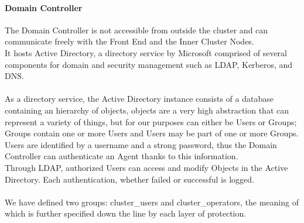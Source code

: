 \paragraph{Domain Controller}
The Domain Controller is not accessible from outside the cluster and can communicate freely with the Front End and the Inner Cluster Nodes.\\
It hosts Active Directory, a directory service by Microsoft comprised of several components for domain and security management such as LDAP, Kerberos, and DNS.\\ \\
As a directory service, the Active Directory instance consists of a database containing an hierarchy of objects, objects are a very high abstraction that can represent a variety of things, but for our purposes can either be Users or Groups; Groups contain one or more Users and Users may be part of one or more Groups. \\Users are identified by a username and a strong password, thus the Domain Controller can authenticate an Agent thanks to this information. \\
Through LDAP, authorized Users can access and modify Objects in the Active Directory. Each authentication, whether failed or successful is logged.\\ \\
We have defined two groups: cluster\_users and cluster\_operators, the meaning of which is further specified down the line by each layer of protection.

